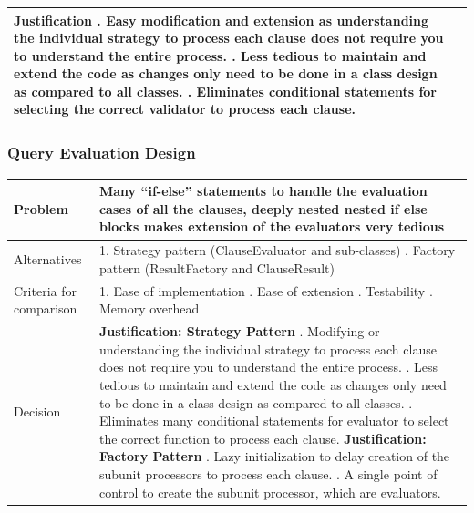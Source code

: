 \documentclass[12pt]{article}
\begin{document}
{{{{{{{{{{{{{\begin{tabular}{|L{5cm} | L{12cm}| }
\textbf{Justification} . Easy modification and extension as understanding the individual strategy to process each clause does not require you to understand the entire process.
. Less tedious to maintain and extend the code as changes only need to be done in a class design as compared to all classes.
. Eliminates conditional statements for selecting the correct validator to process each clause. 
\\
 \hline
\end{tabular}
\subsubsection{Query Evaluation Design}
\begin{tabular}{|L{5cm} | L{12cm}| }
\hline
Problem &
Many “if-else” statements to handle the evaluation cases of all the clauses, deeply nested nested if else blocks makes extension of the evaluators very tedious
 \\
    \hline
Alternatives &
1. Strategy pattern (ClauseEvaluator and sub-classes)
. Factory pattern (ResultFactory and ClauseResult)
 \\
\hline
Criteria for comparison & 
1. Ease of implementation . Ease of extension . Testability . Memory overhead
 \\
\hline
Decision &
\textbf{Justification: Strategy Pattern} . Modifying or understanding the individual strategy to process each clause does not require you to understand the entire process.
. Less tedious to maintain and extend the code as changes only need to be done in a class design as compared to all classes.
. Eliminates many conditional statements for evaluator to select the correct function to process each clause. \newline
\textbf{Justification: Factory Pattern} . Lazy initialization to delay creation of the subunit processors to process each clause. 
. A single point of control to create the subunit processor, which are evaluators.
\\
 \hline
\end{tabular}

}}}}}}}}}}}}}
\end{document}
